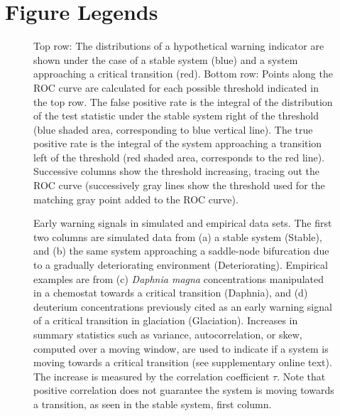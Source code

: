 \documentclass{pnastwo}
\begin{document}
                           \section{Figure Legends}
\begin{figure}[hb]
   \begin{center}
     \label{fig1}
     \caption{Top row: The distributions of a hypothetical warning indicator are shown under the case of a stable system (blue) and a system approaching a critical transition (red).  Bottom row: Points along the ROC curve are calculated for each possible threshold indicated in the top row.  The false positive rate is the integral of the distribution of the test statistic under the stable system right of the threshold (blue shaded area, corresponding to blue vertical line).  The true positive rate is the integral of the system approaching a transition left of the threshold (red shaded area, corresponds to the red line).  Successive columns show the threshold increasing, tracing out the ROC curve (successively gray lines show the threshold used for the matching gray point added to the ROC curve).}
  \end{center}
 \end{figure}



 \begin{figure}[h]
   \begin{center}
     \label{fig2}
     \caption{Early warning signals in simulated and empirical data sets.  The first two columns are simulated data from (a) a stable system (Stable), and (b) the same system approaching a saddle-node bifurcation due to a gradually deteriorating environment (Deteriorating).  Empirical examples are from (c) \emph{Daphnia magna} concentrations manipulated in a chemostat towards a critical transition (Daphnia), and (d) deuterium concentrations previously cited as an early warning signal of a critical transition in glaciation (Glaciation). Increases in summary statistics such as variance, autocorrelation, or skew, computed over a moving window, are used to indicate if a system is moving towards a critical transition (see supplementary online text).  The increase is measured by the correlation coefficient $\tau$.  Note that positive correlation does not guarantee the system is moving towards a transition, as seen in the stable system, first column.}
  \end{center}
 \end{figure}
\end{document}
